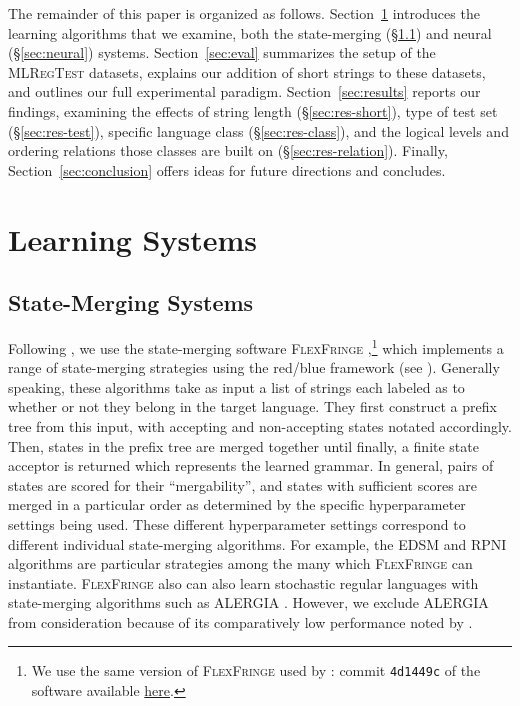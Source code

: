\documentclass[twoside,11pt]{article}
\begin{document}
The remainder of this paper is organized as follows.
Section~\ref{sec:bg} introduces the learning algorithms that we examine, both the state-merging (\S\ref{sec:ff}) and neural (\S\ref{sec:neural}) systems.
Section~\ref{sec:eval} summarizes the setup of the \textsc{MLRegTest} datasets, explains our addition of short strings to these datasets, and outlines our full experimental paradigm.
Section~\ref{sec:results} reports our findings, examining the effects of string length (\S\ref{sec:res-short}), type of test set (\S\ref{sec:res-test}), specific language class (\S\ref{sec:res-class}), and the logical levels and ordering relations those classes are built on (\S\ref{sec:res-relation}).
Finally, Section~\ref{sec:conclusion} offers ideas for future directions and concludes.
  
\section{Learning Systems} \label{sec:bg}


\subsection{State-Merging Systems}\label{sec:ff}

Following \citet{adil23}, we use the state-merging software
\textsc{FlexFringe} \citep{flexfringe},\footnote{We use the same
  version of \textsc{FlexFringe} used by \citeauthor{adil23}: commit
  \texttt{4d1449c} of the software available
  \href{https://github.com/tudelft-cda-lab/FlexFringe/commit/4d1449c4d0cfb3fc5f9a954d5c3a24a11a593a5c\#diff-67290ef9e84d355c83cbd9a0bda3be39e2e14836990458cfcc070506a7e448c2}{here}.
} which implements a range of state-merging strategies using the
red/blue framework (see \citet{Higuera2010}). 
Generally speaking, these algorithms take as input a list of strings each labeled as to whether or not they belong in the target language.
They first construct a prefix tree from this input, with accepting and non-accepting states notated accordingly.
Then, states in the prefix tree are merged together until finally, a finite state acceptor is returned which represents the learned grammar.
In general, pairs of states are scored for their ``mergability'', and states with sufficient scores are merged in a particular order as determined by the specific hyperparameter settings being used.
These different hyperparameter settings correspond to different individual state-merging algorithms.
For example, the EDSM \citep{edsm} and RPNI \citep{rpni} algorithms are particular strategies among the many which \textsc{FlexFringe} can instantiate.
\textsc{FlexFringe} also can also learn stochastic regular
languages with state-merging algorithms such as ALERGIA
\citep{CarrascoOncina1994, carr99}. 
However, we exclude ALERGIA from
consideration because of its comparatively low performance noted by
\citeauthor{adil23}.
\end{document}

